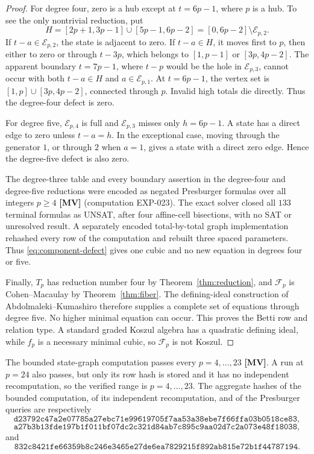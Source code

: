 \documentclass[11pt]{article}
\theoremstyle{definition}
\theoremstyle{remark}
\begin{document}
\begin{proof}
For degree four, zero is a hub except at \(t=6p-1\), where \(p\) is a hub. To see the only
nontrivial reduction, put
\[
H=[2p+1,3p-1]\cup[5p-1,6p-2]
=[0,6p-2]\setminus\mathcal E_{p,2}.
\]
If \(t-a\in\mathcal E_{p,2}\), the state is adjacent to zero. If \(t-a\in H\), it moves first to
\(p\), then either to zero or through \(t-3p\), which belongs to \([1,p-1]\) or
\([3p,4p-2]\). The apparent boundary \(t=7p-1\), where \(t-p\) would be the hole in
\(\mathcal E_{p,3}\), cannot occur with both \(t-a\in H\) and
\(a\in\mathcal E_{p,1}\). At \(t=6p-1\), the vertex set is
\([1,p]\cup[3p,4p-2]\), connected through \(p\). Invalid high totals die directly. Thus the
degree-four defect is zero.

For degree five, \(\mathcal E_{p,4}\) is full and \(\mathcal E_{p,3}\) misses only
\(h=6p-1\). A state has a direct edge to zero unless \(t-a=h\). In the exceptional case, moving
through the generator \(1\), or through \(2\) when \(a=1\), gives a state with a direct zero edge.
Hence the degree-five defect is also zero.

The degree-three table and every boundary assertion in the degree-four and degree-five reductions
were encoded as negated Presburger formulas over all integers \(p\ge4\) \textbf{[MV]}
(computation EXP-023). The exact solver closed all $133$ terminal formulas as UNSAT, after four
affine-cell bisections, with no SAT or unresolved result. A separately encoded total-by-total graph
implementation rehashed every row of the computation and rebuilt three spaced parameters. Thus
\eqref{eq:component-defect} gives one cubic and no new
equation in degrees four or five.

Finally, \(T_p\) has reduction number four by Theorem~\ref{thm:reduction}, and
\(\mathcal F_p\) is Cohen--Macaulay by Theorem~\ref{thm:fiber}. The defining-ideal construction of
Abdolmaleki--Kumashiro \cite[Theorem~2.8]{AbdolmalekiKumashiro2024} therefore supplies a complete
set of equations through degree five. No higher minimal equation can occur. This proves the Betti
row and relation type. A standard graded Koszul algebra has a quadratic defining ideal, while
\(f_p\) is a necessary minimal cubic, so \(\mathcal F_p\) is not Koszul.
\end{proof}

The bounded state-graph computation passes every \(p=4,\ldots,23\) \textbf{[MV]}. A run at
\(p=24\) also passes, but only its row hash is stored and it has no independent recomputation, so
the verified range is \(p=4,\ldots,23\). The aggregate hashes of the bounded computation, of its
independent recomputation, and of the Presburger queries are respectively
\[
\texttt{d23792c47a2e07785a27ebc71e99619705f7aa53a38ebe7f66ffa03b0518ce83},
\]
\[
\texttt{a27b3b13fde197b1f011bf07dc2c321d84ab7c895c9aa02d7c2a073e48f18038},
\]
and
\[
\texttt{832c8421fe66359b8c246e3465e27de6ea7829215f892ab815e72b1f44787194}.
\]
\end{document}
